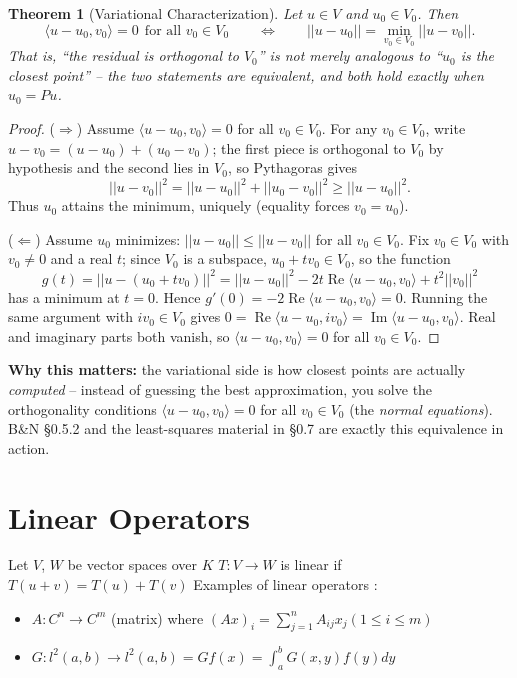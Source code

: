 \documentclass[11pt]{article}
\newcommand{\1}{\mathbf{1}}
\theoremstyle{notestyle}
\newtheorem{theorem}{Theorem}[section]
\theoremstyle{definition}
\begin{document}
\begin{theorem}[Variational Characterization]
\label{thm:variational-projection}
Let $u \in V$ and $u_0 \in V_0$. Then
$$\langle u - u_0, v_0 \rangle = 0 \ \ \text{for all } v_0 \in V_0
\qquad \Longleftrightarrow \qquad
||u - u_0|| = \min_{v_0 \in V_0} ||u - v_0||.$$
That is, ``the residual is orthogonal to $V_0$'' is not merely analogous to
``$u_0$ is the closest point'' -- the two statements are equivalent, and both
hold exactly when $u_0 = Pu$.
\end{theorem}
\begin{proof}
($\Rightarrow$) Assume $\langle u - u_0, v_0 \rangle = 0$ for all $v_0 \in V_0$.
For any $v_0 \in V_0$, write $u - v_0 = (u - u_0) + (u_0 - v_0)$; the first piece
is orthogonal to $V_0$ by hypothesis and the second lies in $V_0$, so Pythagoras
gives
$$||u - v_0||^2 = ||u - u_0||^2 + ||u_0 - v_0||^2 \ge ||u - u_0||^2.$$
Thus $u_0$ attains the minimum, uniquely (equality forces $v_0 = u_0$).

($\Leftarrow$) Assume $u_0$ minimizes: $||u - u_0|| \le ||u - v_0||$ for all
$v_0 \in V_0$. Fix $v_0 \in V_0$ with $v_0 \ne 0$ and a real $t$; since $V_0$ is
a subspace, $u_0 + t v_0 \in V_0$, so the function
$$g(t) = ||u - (u_0 + t v_0)||^2 = ||u - u_0||^2 - 2t\operatorname{Re}\langle
u - u_0, v_0 \rangle + t^2 ||v_0||^2$$
has a minimum at $t = 0$. Hence $g'(0) = -2\operatorname{Re}\langle u - u_0,
v_0 \rangle = 0$. Running the same argument with $i v_0 \in V_0$ gives
$0 = \operatorname{Re}\langle u - u_0, i v_0 \rangle =
\operatorname{Im}\langle u - u_0, v_0 \rangle$. Real and imaginary parts both
vanish, so $\langle u - u_0, v_0 \rangle = 0$ for all $v_0 \in V_0$.
\end{proof}
\par \textbf{Why this matters:} the variational side is how closest points are
actually \emph{computed} -- instead of guessing the best approximation, you solve
the orthogonality conditions $\langle u - u_0, v_0 \rangle = 0$ for all $v_0 \in
V_0$ (the \emph{normal equations}). B\&N \S0.5.2 and the least-squares material
in \S0.7 are exactly this equivalence in action.

\section{Linear Operators}
Let $V$, $W$ be vector spaces over $K$
$T : V \rightarrow W $ is linear if $T(u + v) = T(u) + T(v)$
Examples of linear operators :
\begin{itemize}
    \item $A : C^{n} \rightarrow C^{m}$ (matrix) where $(Ax)_i = \sum_{j=1}^{n}
        A_{ij}x_j (1 \le i \le m)$
    \item $G : l^2(a, b) \rightarrow l^2(a, b) = Gf(x) = \int_{a}^{b} G(x, y) f(y) dy$
        
\end{itemize}
\end{document}
